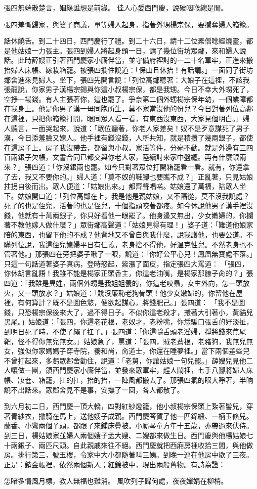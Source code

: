 張四無端散楚言，姻緣誰想是前緣。
佳人心愛西門慶，說破咽喉總是閒。

張四羞慚歸家，與婆子商議，單等婦人起身，指著外甥楊宗保，要攔奪婦人箱籠。

話休饒舌。到二十四日，西門慶行了禮。到二十六日，請十二位素僧唸經燒靈，都是他姑娘一力張主。張四到婦人將起身頭一日，請了幾位街坊眾鄰，來和婦人說話。此時薛嫂正引著西門慶家小廝伴當，並守備府裡討的一二十名軍牢，正進來搬抬婦人床帳、嫁妝箱籠。被張四攔住說道：「保山且休抬！有話講。」一面同了街坊鄰舍進來見婦人。坐下，張四先開言說：「列位高鄰聽著：大娘子在這裡，不該我張龍說，你家男子漢楊宗錫與你這小叔楊宗保，都是我甥。今日不幸大外甥死了，空掙一場錢。有人主張著你，這也罷了。爭奈第二個外甥楊宗保年幼，一個業障都在我身上。他是你男子漢一母同胞所生，莫不家當沒他的份兒？今日對著列位高鄰在這裡，只把你箱籠打開，眼同眾人看一看，有東西沒東西，大家見個明白。」婦人聽言，一面哭起來，說道：「眾位聽著，你老人家差矣！奴不是歹意謀死了男子漢，今日添羞臉又嫁人。他手裡有錢沒錢，人所共知，就是積攢了幾兩銀子，都使在這房子上。房子我沒帶去，都留與小叔。家活等件，分毫不動。就是外邊有三四百兩銀子欠帳，文書合同已都交與你老人家，陸續討來家中盤纏。再有什麼銀兩來？」張四道：「你沒銀兩也罷。如今只對著眾位打開箱籠看一看。就有，你還拿了去，我又不要你的。」婦人道：「莫不奴的鞋腳也要瞧不成？」正亂著，只見姑娘拄拐自後而出。眾人便道：「姑娘出來。」都齊聲唱喏。姑娘還了萬福，陪眾人坐下。姑娘開口道：「列位高鄰在上，我是他是親姑娘，又不隔從，莫不沒我說處？死了的也是侄兒，活著的也是侄兒，十個指頭咬著都疼。如今休說他男子漢手裡沒錢，他就有十萬兩銀子，你只好看他一眼罷了。他身邊又無出，少女嫩婦的，你攔著不教他嫁人做什麼？」眾街鄰高聲道：「姑娘見得有理！」婆子道：「難道他娘家陪的東西，也留下他的不成？他背地又不曾自與我什麼，說我護他，也要公道。不瞞列位說，我這侄兒媳婦平日有仁義，老身捨不得他，好溫克性兒。不然老身也不管著他。」那張四在旁把婆子瞅了一眼，說道：「你好公平心兒！鳳凰無寶處不落。」只這一句話道著婆子真病，登時怒起，紫漲了面皮，指定張四大罵道： 「張四，你休胡言亂語！我雖不能是楊家正頭香主，你這老油嘴，是楊家那膫子肏的？」張四道：「我雖是異姓，兩個外甥是我姐姐養的，你這老咬蟲，女生外向，怎一頭放火，又一頭放水？」姑娘道：「賤沒廉恥老狗骨頭！他少女嫩婦的，你留他在屋裡，有何算計？既不是圖色慾，便欲起謀心，將錢肥己。」張四道： 「我不是圖錢，只恐楊宗保後來大了，過不得日子。不似你這老殺才，搬著大引著小，黃貓兒黑尾。」姑娘道：「張四，你這老花根，老奴才，老粉嘴，你恁騙口張舌的好淡扯，到明日死了時，不使了繩子扛子。」張四道：「你這嚼舌頭老淫婦，掙將錢來焦尾靶，怪不得你無兒無女。」姑娘急了，罵道：「張四，賊老蒼根，老豬狗，我無兒無女，強似你家媽媽子穿寺院，養和尚，肏道士，你還在睡夢裡。」當下兩個差些兒不曾打起來，多虧眾鄰舍勸住，說道：「老舅，你讓姑娘一句兒罷。」薛嫂兒見他二人嚷做一團，領西門慶家小廝伴當，並發來眾軍牢，趕人鬧裡，七手八腳將婦人床帳、妝奩、箱籠，扛的扛，抬的抬，一陣風都搬去了。那張四氣的眼大睜著，半晌說不出話來。眾鄰舍見不是事，安撫了一回，各人都散了。

到六月初二日，西門慶一頂大轎，四對紅紗燈籠，他小叔楊宗保頭上紮著髻兒，穿著青紗衣，撒騎在馬上，送他嫂子成親。西門慶答賀了他一匹錦緞、一柄玉絛兒。蘭香、小鸞兩個丫頭，都跟了來鋪床疊被。小廝琴童方年十五歲，亦帶過來伏侍。到三日，楊姑娘家並婦人兩個嫂子孟大嫂、二嫂都來做生日。西門慶與他楊姑娘七十兩銀子、兩匹尺頭。自此親戚來往不絕。西門慶就把西廂房裡收拾三間，與他做房。排行第三，號玉樓，令家中大小都隨著叫三姨。到晚一連在他房中歇了三夜。正是：銷金帳裡，依然兩個新人；紅錦被中，現出兩般舊物。有詩為證：

怎睹多情風月標，教人無福也難消。
風吹列子歸何處，夜夜嬋娟在柳梢。


